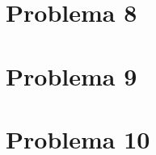 \documentclass{homework}
\begin{document}
\color{black}
	



	\section{Problema 8}
\color{blue}

\color{black}
	



	\section{Problema 9}
\color{blue}

\color{black}
	



	\section{Problema 10}
\color{blue}

\color{black}
	
\end{document}
